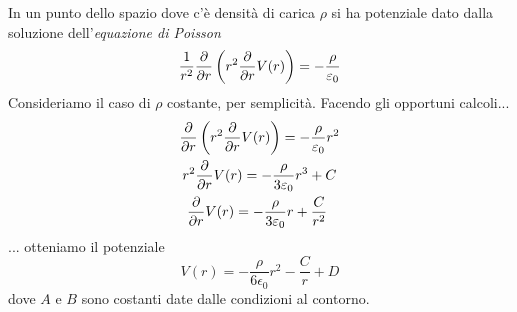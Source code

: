 In un punto dello spazio dove c'è densità di carica $\rho$ si ha potenziale dato dalla soluzione dell'\textit{equazione di Poisson}
\begin{equation*}
	\frac{1}{r^2}\pdv{r}\left(r^2\pdv{r}V(r)\right)=-\frac{\rho}{\varepsilon_0}
\end{equation*}
Consideriamo il caso di $\rho$ costante, per semplicità. Facendo gli opportuni calcoli...
\begin{gather*}
	\pdv{r}\left(r^2\pdv{r}V(r)\right)=-\frac{\rho}{\varepsilon_0}r^2\\
	r^2\pdv{r}V(r)=-\frac{\rho}{3\varepsilon_0}r^3+C\\
	\pdv{r}V(r)=-\frac{\rho}{3\varepsilon_0}r+\frac{C}{r^2}\
\end{gather*}
... otteniamo il potenziale
\begin{equation}
	V(r)=-\frac{\rho}{6\epsilon_0}r^2-\frac{C}{r}+D
\end{equation}
dove $A$ e $B$ sono costanti date dalle condizioni al contorno.
